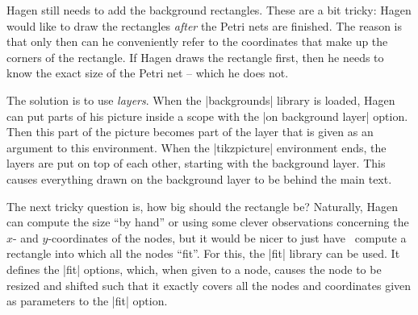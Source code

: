 Hagen still needs to add the background rectangles. These are a bit tricky:
Hagen would like to draw the rectangles \emph{after} the Petri nets are
finished. The reason is that only then can he conveniently refer to the
coordinates that make up the corners of the rectangle. If Hagen draws the
rectangle first, then he needs to know the exact size of the Petri net -- which
he does not.

The solution is to use \emph{layers}. When the |backgrounds| library is loaded,
Hagen can put parts of his picture inside a scope with the
|on background layer| option. Then this part of the picture becomes part of the
layer that is given as an argument to this environment. When the
|{tikzpicture}| environment ends, the layers are put on top of each other,
starting with the background layer. This causes everything drawn on the
background layer to be behind the main text.

The next tricky question is, how big should the rectangle be? Naturally, Hagen
can compute the size ``by hand'' or using some clever observations concerning
the $x$- and $y$-coordinates of the nodes, but it would be nicer to just have
\tikzname\ compute a rectangle into which all the nodes ``fit''. For this, the
|fit| library can be used. It defines the |fit| options, which, when given to a
node, causes the node to be resized and shifted such that it exactly covers all
the nodes and coordinates given as parameters to the |fit| option.
%
\begin{codeexample}[
    preamble={\usetikzlibrary{arrows.meta,backgrounds,fit,positioning}},
    pre={\tikzset{
    pre/.style={<-,shorten <=1pt,>={Stealth[round]},semithick},
    post/.style={->,shorten >=1pt,>={Stealth[round]},semithick},
}},
]
\end{codeexample}


